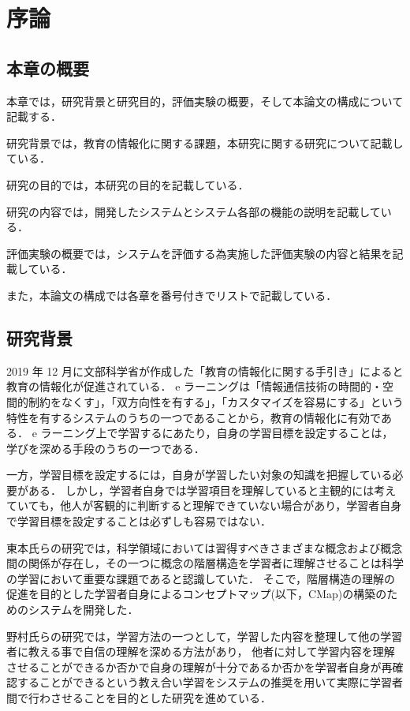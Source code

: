 \section{序論}\label{sec1}
\subsection{本章の概要}
本章では，研究背景と研究目的，評価実験の概要，そして本論文の構成について記載する．

研究背景では，教育の情報化に関する課題，本研究に関する研究について記載している．

研究の目的では，本研究の目的を記載している．

研究の内容では，開発したシステムとシステム各部の機能の説明を記載している．

評価実験の概要では，システムを評価する為実施した評価実験の内容と結果を記載している．

また，本論文の構成では各章を番号付きでリストで記載している．

\subsection{研究背景}
2019 年 12 月に文部科学省が作成した「教育の情報化に関する手引き」\cite{tebiki}によると教育の情報化が促進されている．
e ラーニング\cite{e}は「情報通信技術の時間的・空間的制約をなくす」，「双方向性を有する」，「カスタマイズを容易にする」という特性を有するシステムのうちの一つであることから，教育の情報化に有効である．
e ラーニング上で学習するにあたり，自身の学習目標を設定することは，学びを深める手段のうちの一つである\cite{seman}．

一方，学習目標を設定するには，自身が学習したい対象の知識を把握している必要がある．
しかし，学習者自身では学習項目を理解していると主観的には考えていても，他人が客観的に判断すると理解できていない場合があり，学習者自身で学習目標を設定することは必ずしも容易ではない．

東本氏らの研究では，科学領域においては習得すべきさまざまな概念および概念間の関係が存在し，その一つに概念の階層構造を学習者に理解させることは科学の学習において重要な課題であると認識していた．
そこで，階層構造の理解の促進を目的とした学習者自身によるコンセプトマップ(以下，CMap)\cite{concept}の構築のためのシステムを開発した\cite{toumoto}．

野村氏らの研究では，学習方法の一つとして，学習した内容を整理して他の学習者に教える事で自信の理解を深める方法があり，
他者に対して学習内容を理解させることができるか否かで自身の理解が十分であるか否かを学習者自身が再確認することができるという教え合い学習をシステムの推奨を用いて実際に学習者間で行わさせることを目的とした研究を進めている\cite{nomura}．

